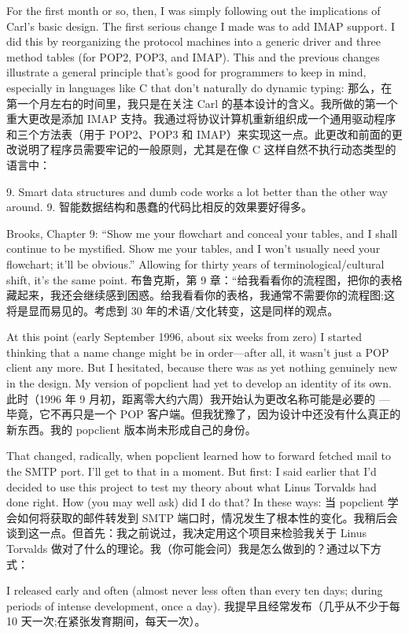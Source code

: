 \documentclass[a4paper,12pt,UTF8,twoside]{ctexbook}
\begin{document}
For the first month or so, then, I was simply following out the implications of Carl's basic design. The first serious change I made was to add IMAP support. I did this by reorganizing the protocol machines into a generic driver and three method tables (for POP2, POP3, and IMAP). This and the previous changes illustrate a general principle that's good for programmers to keep in mind, especially in languages like C that don't naturally do dynamic typing:
那么，在第一个月左右的时间里，我只是在关注 Carl 的基本设计的含义。我所做的第一个重大更改是添加 IMAP 支持。我通过将协议计算机重新组织成一个通用驱动程序和三个方法表（用于 POP2、POP3 和 IMAP）来实现这一点。此更改和前面的更改说明了程序员需要牢记的一般原则，尤其是在像 C 这样自然不执行动态类型的语言中：

9. Smart data structures and dumb code works a lot better than the other way around.
9. 智能数据结构和愚蠢的代码比相反的效果要好得多。

Brooks, Chapter 9: ``Show me your flowchart and conceal your tables, and I shall continue to be mystified. Show me your tables, and I won't usually need your flowchart; it'll be obvious.'' Allowing for thirty years of terminological/cultural shift, it's the same point.
布鲁克斯，第 9 章：“给我看看你的流程图，把你的表格藏起来，我还会继续感到困惑。给我看看你的表格，我通常不需要你的流程图;这将是显而易见的。考虑到 30 年的术语/文化转变，这是同样的观点。

At this point (early September 1996, about six weeks from zero) I started thinking that a name change might be in order—after all, it wasn't just a POP client any more. But I hesitated, because there was as yet nothing genuinely new in the design. My version of popclient had yet to develop an identity of its own.
此时（1996 年 9 月初，距离零大约六周）我开始认为更改名称可能是必要的 — 毕竟，它不再只是一个 POP 客户端。但我犹豫了，因为设计中还没有什么真正的新东西。我的 popclient 版本尚未形成自己的身份。

That changed, radically, when popclient learned how to forward fetched mail to the SMTP port. I'll get to that in a moment. But first: I said earlier that I'd decided to use this project to test my theory about what Linus Torvalds had done right. How (you may well ask) did I do that? In these ways:
当 popclient 学会如何将获取的邮件转发到 SMTP 端口时，情况发生了根本性的变化。我稍后会谈到这一点。但首先：我之前说过，我决定用这个项目来检验我关于 Linus Torvalds 做对了什么的理论。我（你可能会问）我是怎么做到的？通过以下方式：

I released early and often (almost never less often than every ten days; during periods of intense development, once a day).
我提早且经常发布（几乎从不少于每 10 天一次;在紧张发育期间，每天一次）。
\end{document}
